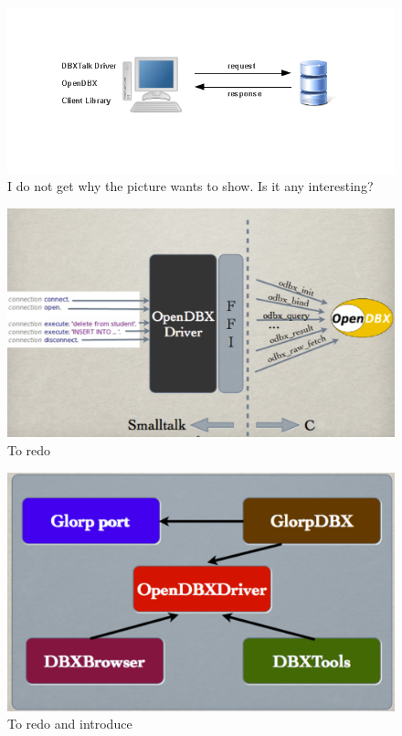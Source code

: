 \documentclass[a4paper,10pt,twoside]{book}
\begin{document}
\begin{figure}
\begin{center}
\includegraphics[width=\linewidth]{dbx_architecture}
\caption{I do not get why the picture wants to show. Is it any interesting?}
\end{center}
\end{figure}

\begin{figure}
\begin{center}
\includegraphics[width=\linewidth]{Architecture}
\caption{To redo}
\end{center}
\end{figure}

\begin{figure}
\begin{center}
\includegraphics[width=\linewidth]{Tools}
\caption{To redo and introduce}
\end{center}
\end{figure}
\end{document}
